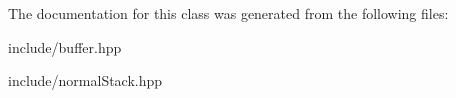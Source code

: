 The documentation for this class was generated from the following files\+:\begin{DoxyCompactItemize}
\item 
include/buffer.\+hpp\item 
include/normal\+Stack.\+hpp\end{DoxyCompactItemize}
